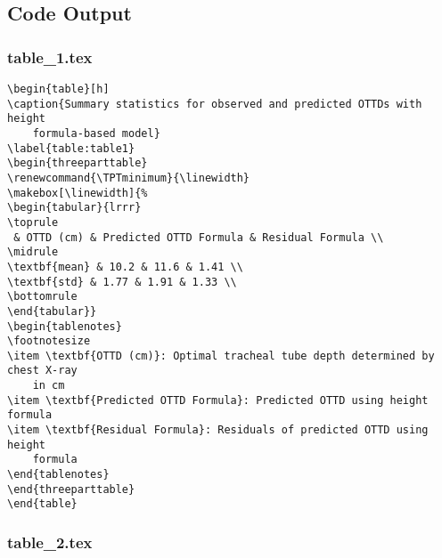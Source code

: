 \documentclass[11pt]{article}
\begin{document}
\subsection{Code Output}

\subsubsection*{table\_1.tex}

\begin{Verbatim}[tabsize=4]
\begin{table}[h]
\caption{Summary statistics for observed and predicted OTTDs with height
	formula-based model}
\label{table:table1}
\begin{threeparttable}
\renewcommand{\TPTminimum}{\linewidth}
\makebox[\linewidth]{%
\begin{tabular}{lrrr}
\toprule
 & OTTD (cm) & Predicted OTTD Formula & Residual Formula \\
\midrule
\textbf{mean} & 10.2 & 11.6 & 1.41 \\
\textbf{std} & 1.77 & 1.91 & 1.33 \\
\bottomrule
\end{tabular}}
\begin{tablenotes}
\footnotesize
\item \textbf{OTTD (cm)}: Optimal tracheal tube depth determined by chest X-ray
	in cm
\item \textbf{Predicted OTTD Formula}: Predicted OTTD using height formula
\item \textbf{Residual Formula}: Residuals of predicted OTTD using height
	formula
\end{tablenotes}
\end{threeparttable}
\end{table}

\end{Verbatim}

\subsubsection*{table\_2.tex}
\end{document}
